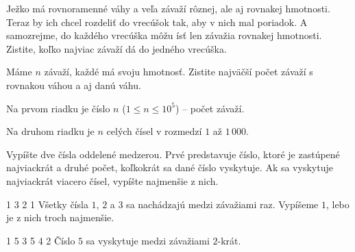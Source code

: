 




Ježko má rovnoramenné váhy a veľa závaží rôznej, ale aj rovnakej hmotnosti. Teraz by ich chcel
rozdeliť do vrecúšok tak, aby v nich mal poriadok. A samozrejme, do každého vrecúška môžu ísť len závažia
rovnakej hmotnosti. Zistite, koľko najviac závaží dá do jedného vrecúška.


Máme $n$ závaží, každé má svoju hmotnosť. Zistite najväčší počet závaží s rovnakou váhou a aj danú
váhu.


Na prvom riadku je číslo $n$ ($1 \leq n \leq 10^5$) -- počet závaží.

Na druhom riadku je $n$ celých čísel v rozmedzí $1$ až $1\,000$.


Vypíšte dve čísla oddelené medzerou. Prvé predstavuje číslo, ktoré je zastúpené najviackrát a druhé
počet, koľkokrát sa dané číslo vyskytuje. Ak sa vyskytuje najviackrát viacero čísel, vypíšte najmenšie
z nich.


1 3 2
 1
\komentar
Všetky čísla $1$, $2$ a $3$ sa nachádzajú medzi závažiami raz. Vypíšeme $1$, lebo je z nich troch
najmenšie.
\koniec

1 5 3 5 4
 2
\komentar
Číslo $5$ sa vyskytuje medzi závažiami $2$-krát.
\koniec


